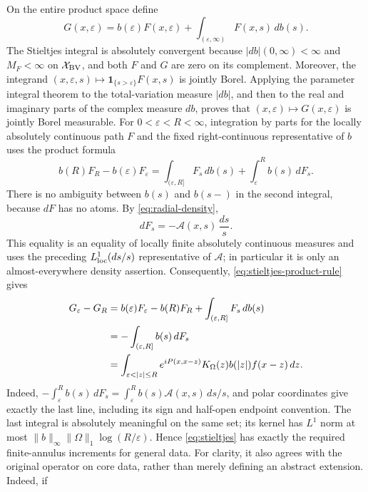 \documentclass[11pt]{article}
\numberwithin{equation}{section}
\theoremstyle{remark}
\theoremstyle{definition}
\newcommand{\norm}[1]{\lVert #1\rVert}
\begin{document}
On the entire product space define
\begin{equation}\label{eq:stieltjes}
 G(x,\varepsilon)=b(\varepsilon)F(x,\varepsilon)
 +\int_{(\varepsilon,\infty)}F(x,s)\,db(s).
\end{equation}
The Stieltjes integral is absolutely convergent because
$|db|(0,\infty)<\infty$ and $M_F<\infty$ on
\(\mathcal X_{\rm BV}\), and both \(F\) and \(G\) are zero on its
complement.  Moreover, the integrand
\((x,\varepsilon,s)\mapsto\mathbf1_{\{s>\varepsilon\}}F(x,s)\) is jointly
Borel.  Applying the parameter integral theorem to the total-variation
measure \(|db|\), and then to the real and imaginary parts of the complex
measure \(db\), proves that \((x,\varepsilon)\mapsto G(x,\varepsilon)\) is
jointly Borel measurable.  For
$0<\varepsilon<R<\infty$, integration by parts for the locally absolutely
continuous path $F$ and the fixed right-continuous representative of $b$
uses the product formula
\begin{equation}\label{eq:stieltjes-product-rule}
 b(R)F_R-b(\varepsilon)F_\varepsilon
 =\int_{(\varepsilon,R]}F_s\,db(s)
  +\int_\varepsilon^R b(s)\,dF_s.
\end{equation}
There is no ambiguity between $b(s)$ and $b(s-)$ in the second integral,
because $dF$ has no atoms.  By \eqref{eq:radial-density},
\[
 dF_s=-\mathcal A(x,s)\,\frac{ds}{s}.
\]
This equality is an equality of locally finite absolutely continuous
measures and uses the preceding $L^1_{\rm loc}(ds/s)$ representative of
$\mathcal A$; in particular it is only an almost-everywhere density
assertion.
Consequently, \eqref{eq:stieltjes-product-rule} gives
\begin{align}
 G_\varepsilon-G_R
 &=b(\varepsilon)F_\varepsilon-b(R)F_R
   +\int_{(\varepsilon,R]}F_s\,db(s)\notag\\
 &=-\int_{(\varepsilon,R]}b(s)\,dF_s\notag\\
 &=\int_{\varepsilon<|z|\le R}
   e^{iP(x,x-z)}K_\Omega(z)b(|z|)f(x-z)\,dz.
 \label{eq:general-bv-finite-shell}
\end{align}
Indeed,
$-\int_\varepsilon^R b(s)\,dF_s
=\int_\varepsilon^R b(s)\mathcal A(x,s)\,ds/s$, and polar coordinates
give exactly the last line, including its sign and half-open endpoint
convention.
The last integral is absolutely meaningful on the same set; its kernel has
$L^1$ norm at most
$\norm b_\infty\norm\Omega_1\log(R/\varepsilon)$.  Hence
\eqref{eq:stieltjes} has exactly the required finite-annulus increments for
general data.  For clarity, it also agrees with the original operator on
core data, rather than merely defining an abstract extension.  Indeed, if
\end{document}
